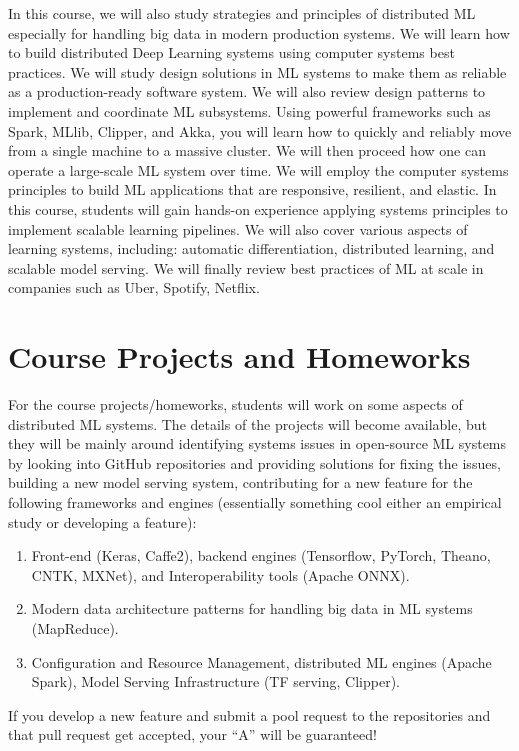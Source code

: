 \documentclass[11pt]{article}
\begin{document}
In this course, we will also study strategies and principles of distributed ML especially for handling big data in modern production systems. We will learn how to build distributed Deep Learning systems using computer systems best practices. We will study design solutions in ML systems to make them as reliable as a production-ready software system. We will also review design patterns to implement and coordinate ML subsystems. Using powerful frameworks such as Spark, MLlib, Clipper, and Akka, you will learn how to quickly and reliably move from a single machine to a massive cluster. We will then proceed how one can operate a large-scale ML system over time. We will employ the computer systems principles to build ML applications that are responsive, resilient, and elastic. In this course, students will gain hands-on experience applying systems principles to implement scalable learning pipelines. We will also cover various aspects of learning systems, including: automatic differentiation, distributed learning, and scalable model serving. We will finally review best practices of ML at scale in companies such as Uber, Spotify, Netflix. 


\section*{Course Projects and Homeworks}

For the course projects/homeworks, students will work on some aspects of distributed ML systems. The details of the projects will become available, but they will be mainly around identifying systems issues in open-source ML systems by looking into GitHub repositories and providing solutions for fixing the issues, building a new model serving system, contributing for a new feature for the following frameworks and engines (essentially something cool either an empirical study or developing a feature):
\begin{enumerate}
\item Front-end (Keras, Caffe2), backend engines (Tensorflow, PyTorch, Theano, CNTK, MXNet), and Interoperability tools (Apache ONNX).
\item Modern data architecture patterns for handling big data in ML systems (MapReduce).
\item Configuration and Resource Management, distributed ML engines (Apache Spark), Model Serving Infrastructure (TF serving, Clipper).
\end{enumerate}

If you develop a new feature and submit a pool request to the repositories and that pull request get accepted, your ``A'' will be guaranteed!
\end{document}
